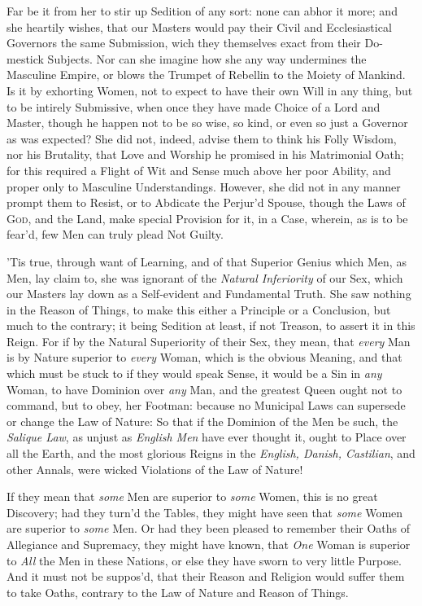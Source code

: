 Far be it from her to stir up Sedition of any sort: none can abhor it
more; and she heartily wishes, that our Masters would pay their Civil
and Ecclesiastical Governors the same Submission, wich they themselves
exact from their Do-mestick Subjects. Nor can she imagine
how she any way undermines the Masculine Empire, or blows the Trumpet
of Rebellin to the Moiety of Mankind. Is it by exhorting Women, not to
expect to have their own Will in any thing, but to be intirely
Submissive, when once they have made Choice of a Lord and Master,
though he happen not to be so wise, so kind, or even so just a
Governor as was expected? She did not, indeed, advise them to think
his Folly Wisdom, nor his Brutality, that Love and Worship he promised
in his Matrimonial Oath; for this required a Flight of Wit and Sense
much above her poor Ability, and proper only to Masculine
Understandings. However, she did not in any manner prompt them to
Resist, or to Abdicate the Perjur'd Spouse, though the Laws of
\textsc{God}, and the Land, make special Provision for it, in a Case,
wherein, as is to be fear'd, few Men can truly plead Not Guilty.

'Tis true, through want of Learning, and of that Superior
Genius which Men, as Men, lay claim to, she was ignorant of the
\textit{Natural Inferiority} of our Sex, which our Masters lay down as
a Self-evident and Fundamental Truth. She saw nothing in the Reason of
Things, to make this either a Principle or a Conclusion, but much to
the contrary; it being Sedition at least, if not Treason, to assert it
in this Reign. For if by the Natural Superiority of their Sex, they
mean, that \textit{every} Man is by Nature superior to \textit{every}
Woman, which is the obvious Meaning, and that which must be stuck to
if they would speak Sense, it would be a Sin in \textit{any} Woman, to
have Dominion over \textit{any} Man, and the greatest Queen ought not
to command, but to obey, her Footman: because no Municipal Laws can
supersede or change the Law of Nature: So that if the Dominion of the
Men be such, the \textit{Salique Law}, as unjust as \textit{English
Men} have ever thought it, ought to Place over all  the
Earth, and the most glorious Reigns in the \textit{English, Danish,
Castilian}, and other Annals, were wicked Violations of the Law of
Nature!

If they mean that \textit{some} Men are superior to \textit{some}
Women, this is no great Discovery; had they turn'd the Tables, they
might have seen that \textit{some} Women are superior to \textit{some}
Men. Or had they been pleased to remember their Oaths of Allegiance
and Supremacy, they might have known, that \textit{One} Woman is
superior to \textit{All} the Men in these Nations, or else they have
sworn to very little Purpose. And it must not be suppos'd, that their
Reason and Religion would suffer them to take Oaths, contrary to the
Law of Nature and Reason of Things.

